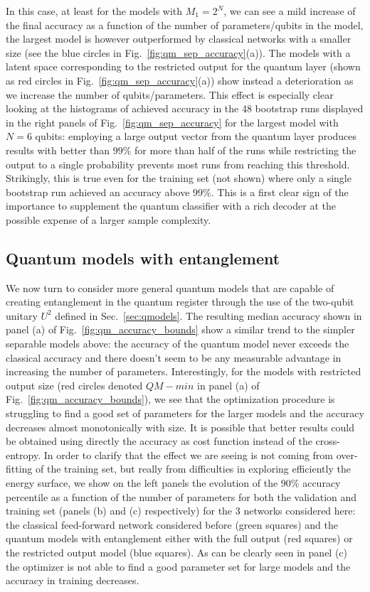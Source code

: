 In this case, at least for the models with $M_1=2^{N}$, we can see a mild increase of the final accuracy as a function of the number of parameters/qubits in the model, the largest model is however outperformed by classical networks with a smaller size (see the blue circles in Fig.~\ref{fig:qm_sep_accuracy}(a)). The models with a latent space corresponding to the restricted output for the quantum layer (shown as red circles in Fig.~\ref{fig:qm_sep_accuracy}(a)) show instead a deterioration as we increase the number of qubits/parameters. This effect is especially clear looking at the histograms of achieved accuracy in the 48 bootstrap runs displayed in the right panels of Fig.~\ref{fig:qm_sep_accuracy} for the largest model with $N=6$ qubits: employing a large output vector from the quantum layer produces results with better than $99\%$ for more than half of the runs while restricting the output to a single probability prevents most runs from reaching this threshold. Strikingly, this is true even for the training set (not shown) where only a single bootstrap run achieved an accuracy above $99\%$. This is a first clear sign of the importance to supplement the quantum classifier with a rich decoder at the possible expense of a larger sample complexity.

\subsection{Quantum models with entanglement}
\label{sec:qm_res_withent}

We now turn to consider more general quantum models that are capable of creating entanglement in the quantum register through the use of the two-qubit unitary $U^2$ defined in Sec.~\ref{sec:qmodels}. The resulting median accuracy shown in panel (a) of Fig.~\ref{fig:qm_accuracy_bounds} show a similar trend to the simpler separable models above: the accuracy of the quantum model never exceeds the classical accuracy and there doesn't seem to be any measurable advantage in increasing the number of parameters. Interestingly, for the models with restricted output size (red circles denoted $QM - min$ in panel (a) of Fig.~\ref{fig:qm_accuracy_bounds}), we see that the optimization procedure is struggling to find a good set of parameters for the larger models and the accuracy decreases almost monotonically with size. It is possible that better results could be obtained using directly the accuracy as cost function instead of the cross-entropy. In order to clarify that the effect we are seeing is not coming from over-fitting of the training set, but really from difficulties in exploring efficiently the energy surface, we show on the left panels the evolution of the $90\%$ accuracy percentile as a function of the number of parameters for both the validation and training set (panels (b) and (c) respectively) for the 3 networks considered here: the classical feed-forward network considered before (green squares) and the quantum models with entanglement either with the full output (red squares) or the restricted output model (blue squares). As can be clearly seen in panel (c) the optimizer is not able to find a good parameter set for large models and the accuracy in training decreases.

